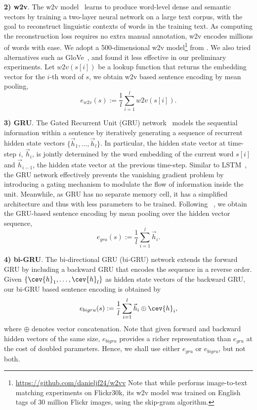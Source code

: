 \textbf{2) w2v}. The w2v model~\cite{w2v} learns to produce word-level dense and semantic vectors by training a two-layer neural network on a large text corpus, with the goal to reconstruct linguistic contexts of words in the training text. As computing the reconstruction loss requires no extra manual annotation, w2v encodes millions of words with ease. We adopt a 500-dimensional w2v model\footnote{\url{https://github.com/danieljf24/w2vv} Note that while \cite{w2vv} performs image-to-text matching experiments on Flickr30k, its w2v model was trained on English tags of 30 million Flickr images, using the skip-gram algorithm.\label{w2v-flickr}} from \cite{w2vv}. 
We also tried alternatives such as GloVe~\cite{glove}, and found it less effective in our preliminary experiments. Let $w2v(s[i])$ be a lookup function that returns the embedding vector for the $i$-th word of $s$, we obtain w2v based sentence encoding by mean pooling, \ie
\begin{equation} \label{eq:w2v}
e_{w2v}(s) := \frac{1}{l}\sum_{i=1}^l w2v(s[i]).
\end{equation}

\textbf{3) GRU}. The Gated Recurrent Unit (GRU) network~\cite{gru} models the sequential information within a sentence by iteratively generating a sequence of recurrent hidden state vectors $\{\vec{h}_1, \ldots, \vec{h}_l\}$. In particular, the hidden state vector at time-step $i$, $\vec{h}_i$, is jointly determined by the word embedding of the current word $s[i]$ and  $\vec{h}_{i-1}$, the hidden state vector at the previous time-step. Similar to LSTM~\cite{lstm}, the GRU network effectively prevents the vanishing gradient problem by introducing a gating mechanism to modulate the flow of information inside the unit. Meanwhile, as GRU has no separate memory cell, it has a simplified architecture and thus with less parameters to be trained. Following ~\cite{w2vvpp}, we obtain the GRU-based sentence encoding by mean pooling over the hidden vector sequence, \ie
\begin{equation} \label{eq:gru}
e_{gru}(s) := \frac{1}{l}\sum_{i=1}^l \vec{h}_i.
\end{equation}

\textbf{4) bi-GRU}. The bi-directional GRU (bi-GRU) network extends the forward GRU by including a backward GRU that encodes the sequence in a reverse order. Given $\{\cev{h}_1, \ldots, \cev{h}_l\}$ as hidden state vectors of the backward GRU, our bi-GRU based sentence encoding is obtained by 
\begin{equation} \label{eq:gru}
e_{bigru}(s) := \frac{1}{l}\sum_{i=1}^l \vec{h}_i \oplus \cev{h}_i,
\end{equation}
where $\oplus$ denotes vector concatenation. Note that given forward and backward hidden vectors of the same size, $e_{bigru}$ provides a richer representation than $e_{gru}$ at the cost of doubled parameters. Hence, we shall use either $e_{gru}$ or $e_{bigru}$, but not both. 


